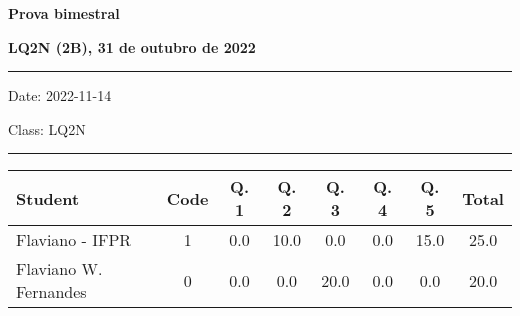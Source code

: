 \documentclass[12pt, addpoints]{exam}
\begin{document}
    \begin{minipage}[b]{0.75\linewidth}
        \begin{flushleft}
            {\bf \large Prova bimestral}
        \end{flushleft}
        \begin{flushleft}
            {\bf \large LQ2N (2B), 31 de outubro de 2022}
        \end{flushleft}
    \end{minipage}
    \vspace{0.5cm} \hrule \vspace{0.5cm}
    \begin{minipage}{0.70\linewidth}
        \begin{flushleft}
            Date: 2022-11-14
        \end{flushleft}
    \end{minipage}
    \begin{minipage}{0.25\linewidth}
        \begin{flushright}
            Class: LQ2N
        \end{flushright}
    \end{minipage}
    \vspace{0.5cm} \hrule \vspace{0.5cm}
    \begin{table}[h!]
\centering
\begin{tabular}{lccccccc}
\hline
Student & Code & Q. 1 & Q. 2 & Q. 3 & Q. 4 & Q. 5 & Total\\
\hline
Flaviano - IFPR & 1 & 0.0 & 10.0 & 0.0 & 0.0 & 15.0 & 25.0\\Flaviano W. Fernandes & 0 & 0.0 & 0.0 & 20.0 & 0.0 & 0.0 & 20.0\\\hline
\end{tabular}
\end{table}
\end{document}
